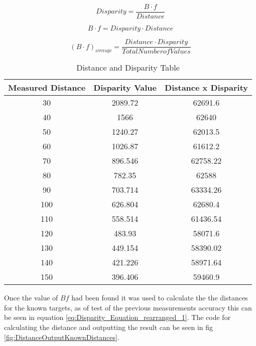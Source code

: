 \documentclass[conference]{IEEEtran}
\begin{document}
\begin{equation} \label{eq:Disparity_Equation}
Disparity = \frac{B \cdot f}{Distance}
\end{equation}

\begin{equation} \label{eq:Disparity_Equation_rearranged_1}
B \cdot f = Disparity \cdot Distance
\end{equation}

\begin{equation} \label{eq:AverageDisparity}
(B \cdot f)_\textrm{average} = \frac{Distance \cdot Disparity}{Total Number of Values}
\end{equation}

\begin{table}
\begin{center}
\caption{Distance and Disparity Table}
\begin{tabular}{ || c || c || c || }
\hline
 Measured Distance & Disparity Value & Distance x Disparity\\ 
\hline
 30 & 2089.72 & 62691.6 \\  
\hline
 40 & 1566 & 62640 \\  
\hline
 50 & 1240.27 & 62013.5 \\  
\hline
 60 & 1026.87 & 61612.2 \\  
\hline
 70 & 896.546 & 62758.22 \\  
\hline
 80 & 782.35 & 62588 \\  
\hline
 90 & 703.714 & 63334.26 \\  
\hline
 100 & 626.804 & 62680.4 \\  
\hline
 110 & 558.514 & 61436.54 \\  
\hline
 120 & 483.93 & 58071.6 \\  
\hline
 130 & 449.154 & 58390.02 \\  
\hline
 140 & 421.226 & 58971.64 \\  
\hline
 150 & 396.406 & 59460.9 \\  
\hline

\end{tabular}
\label{table:distance_and_disparity_tables}
\end{center}
\end{table}

Once the value of $Bf$ had been found it was used to calculate the the distances for the known targets, as of test of the previous measurements accuracy this can be seen in equation \ref{eq:Disparity_Equation_rearranged_1}. The code for calculating the distance and outputting the result can be seen in fig \ref{fig:DistanceOutputKnownDistances}.
\end{document}
